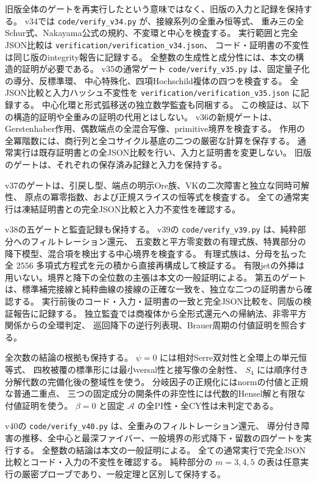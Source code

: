 旧版全体のゲートを再実行したという意味ではなく、旧版の入力と記録を保持する。
v34では \nolinkurl{code/verify_v34.py} が、接線系列の全重み恒等式、
重み三の全Schur式、Nakayama公式の規約、不変環と中心を検査する。
実行範囲と完全JSON比較は \nolinkurl{verification/verification_v34.json}、
コード・証明書の不変性は同じ版のintegrity報告に記録する。
全整数の生成性と成分性には、本文の構造的証明が必要である。
v35の通常ゲート \nolinkurl{code/verify_v35.py} は、固定量子化の導分、反標準環、
中心特殊化、四項Hochschild複体の四つを検査する。
全JSON比較と入力ハッシュ不変性を \nolinkurl{verification/verification_v35.json} に記録する。
中心化環と形式弧移送の独立数学監査も同梱する。
この検証は、以下の構造的証明や全重みの証明の代用とはしない。
v36の新規ゲートは、Gerstenhaber作用、偶数端点の全混合写像、primitive境界を検査する。
作用の全冪階数には、商行列と全コサイクル基底の二つの厳密な計算を保存する。
通常実行は既存証明書との全JSON比較を行い、入力と証明書を変更しない。
旧版のゲートは、それぞれの保存済み記録と入力を保持する。

v37のゲートは、引戻し型、端点の明示Ore族、VKの二次障害と独立な同時可解性、
原点の冪零指数、および正規スライスの恒等式を検査する。
全ての通常実行は凍結証明書との完全JSON比較と入力不変性を確認する。

v38の五ゲートと監査記録も保持する。
v39の \nolinkurl{code/verify_v39.py} は、純粋部分へのフィルトレーション還元、
五変数と平方零変数の有理式族、特異部分の降下模型、混合項を検出する中心境界を検査する。
有理式族は、分母を払った全 $2556$ 多項式方程式を元の積から直接再構成して検証する。
有限jetの外挿は用いない。境界と降下の全位数の主張は本文の一般証明による。
第五のゲートは、標準補完接線と純粋曲線の接線の正確な一致を、独立な二つの証明書から確認する。
実行前後のコード・入力・証明書の一致と完全JSON比較を、同版の検証報告に記録する。
独立監査では商複体から全形式還元への帰納法、非零平方関係からの全環判定、
巡回降下の逆行列表現、Brauer周期の付値証明を照合する。

全次数の結論の根拠も保持する。
$\psi=0$ には相対Serre双対性と全環上の単元恒等式、
四枚被覆の標準形には最小versal性と接写像の全射性、
$S_4$ には順序付き分解代数の完備化後の整域性を使う。
分岐因子の正規化にはnormの付値と正規な普通二重点、
三つの固定成分の開条件の非空性には代数的Hensel解と有限な付値証明を使う。
$\beta=0$ と固定 $\mathcal A$ の全PI性・全CY性は未判定である。


v40の \nolinkurl{code/verify_v40.py} は、全重みのフィルトレーション還元、
導分付き障害の推移、全中心と最深ファイバー、一般境界の形式降下・留数の四ゲートを実行する。
全整数の結論は本文の一般証明による。
全ての通常実行で完全JSON比較とコード・入力の不変性を確認する。
純粋部分の $m=3,4,5$ の表は任意実行の厳密プローブであり、一般定理と区別して保持する。

